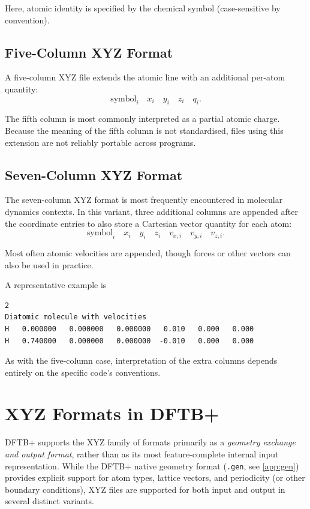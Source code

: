 Here, atomic identity is specified by the chemical symbol
(case-sensitive by convention).

\subsection{Five-Column XYZ Format}

A five-column XYZ file extends the atomic line with an additional
per-atom quantity:
\[
\text{symbol}_i \quad x_i \quad y_i \quad z_i \quad q_i.
\]

The fifth column is most commonly interpreted as a partial atomic
charge. Because the meaning of the fifth column is not standardised,
files using this extension are not reliably portable across programs.

\subsection{Seven-Column XYZ Format}

The seven-column XYZ format is most frequently encountered in
molecular dynamics contexts. In this variant, three additional columns
are appended after the coordinate entries to also store a Cartesian
vector quantity for each atom:
\[
\text{symbol}_i \quad x_i \quad y_i \quad z_i \quad v_{x,i} \quad
v_{y,i} \quad v_{z,i}.
\]

Most often atomic velocities are appended, though forces or other
vectors can also be used in practice.

A representative example is
\begin{verbatim}
2
Diatomic molecule with velocities
H   0.000000   0.000000   0.000000   0.010   0.000   0.000
H   0.740000   0.000000   0.000000  -0.010   0.000   0.000
\end{verbatim}

As with the five-column case, interpretation of the extra columns
depends entirely on the specific code's conventions.

\section{XYZ Formats in DFTB+}

DFTB+ supports the XYZ family of formats primarily as a \emph{geometry
exchange and output format}, rather than as its most feature-complete
internal input representation. While the DFTB+ native geometry format
(\texttt{.gen}, see \ref{app:gen}) provides explicit support for atom
types, lattice vectors, and periodicity (or other boundary
conditions), XYZ files are supported for both input and output in
several distinct variants.

